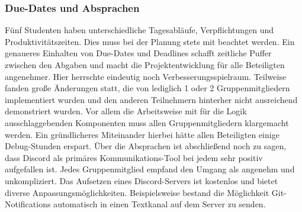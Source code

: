 \subsubsection{Due-Dates und Absprachen}
Fünf Studenten haben unterschiedliche Tagesabläufe, Verpflichtungen und Produktivitätszeiten.
Dies muss bei der Planung stets mit beachtet werden.
Ein genaueres Einhalten von Due-Dates und Deadlines schafft zeitliche Puffer zwischen den Abgaben
und macht die Projektentwicklung für alle Beteiligten angenehmer.
Hier herrschte eindeutig noch Verbesserungsspielraum.
Teilweise fanden große Änderungen statt, die von lediglich 1 oder 2 Gruppenmitgliedern
implementiert wurden und den anderen Teilnehmern hinterher nicht ausreichend demonstriert wurden.
Vor allem die Arbeitsweise mit für die Logik ausschlaggebenden Komponenten muss allen
Gruppenmitgliedern klargemacht werden.
Ein gründlicheres Miteinander hierbei hätte allen Beteiligten einige Debug-Stunden erspart.
Über die Absprachen ist abschließend noch zu sagen, dass Discord
als primäres Kommunikations-Tool bei jedem sehr positiv aufgefallen ist.
Jedes Gruppenmitglied empfand den Umgang als angenehm und unkompliziert.
Das Aufsetzen eines Discord-Servers ist kostenlos und bietet diverse Anpassungsmöglichkeiten.
Beispielsweise bestand die Möglichkeit Git-Notifications automatisch in einen
Textkanal auf dem Server zu senden.